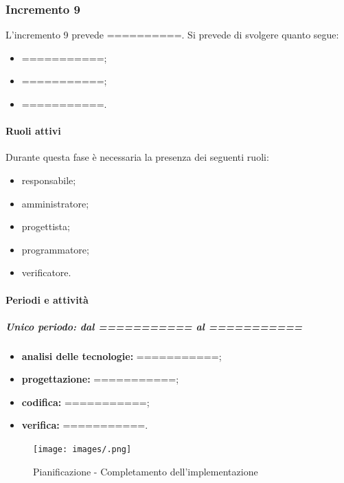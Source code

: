 
\subsubsection{Incremento 9}
L'incremento 9 prevede ==========. Si prevede di svolgere quanto segue:
\begin{itemize}
	\item ===========;
	\item ===========;
	\item ===========.
\end{itemize}

\paragraph{Ruoli attivi}
Durante questa fase è necessaria la presenza dei seguenti ruoli: 
\begin{itemize} 
	\item responsabile; 
	\item amministratore; 
	\item progettista; 
	\item programmatore; 
	\item verificatore.
\end{itemize}

\paragraph{Periodi e attività}
\subparagraph{Unico periodo: dal =========== al ===========}
\begin{itemize}
	\item \textbf{analisi delle tecnologie:} ===========;
	\item \textbf{progettazione:} ===========;
	\item \textbf{codifica:} ===========;
	\item \textbf{verifica:} ===========.
\end{itemize}

\newpage 

\begin{landscape} 
	\begin{figure}[h!] 
		\texttt{[image: images/.png]} 
		\caption{Pianificazione - Completamento dell'implementazione} 
	\end{figure} 
\end{landscape} 

\newpage %

